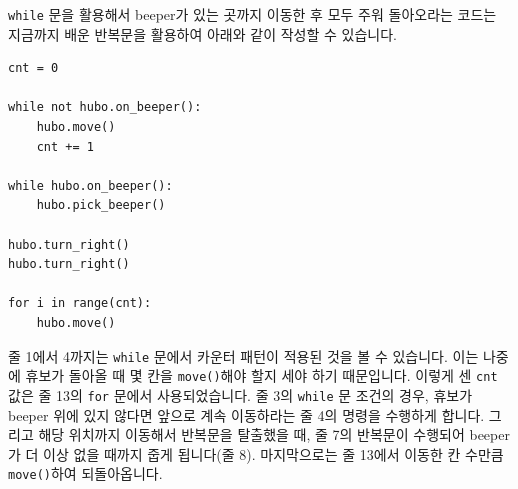 \documentclass[../main.tex]{subfiles}
\begin{document}
\texttt{while} 문을 활용해서 beeper가 있는 곳까지 이동한 후 모두 주워 돌아오라는 코드는 지금까지 배운 반복문을 활용하여 아래와 같이 작성할 수 있습니다.
\begin{verbatim}
cnt = 0

while not hubo.on_beeper():
    hubo.move()
    cnt += 1

while hubo.on_beeper():
    hubo.pick_beeper()

hubo.turn_right()
hubo.turn_right()

for i in range(cnt):
    hubo.move()
\end{verbatim}
줄 1에서 4까지는 \texttt{while} 문에서 카운터 패턴이 적용된 것을 볼 수 있습니다.
이는 나중에 휴보가 돌아올 때 몇 칸을 \texttt{move()}해야 할지 세야 하기 때문입니다.
이렇게 센 \texttt{cnt} 값은 줄 13의 \texttt{for} 문에서 사용되었습니다.
줄 3의 \texttt{while} 문 조건의 경우, 휴보가 beeper 위에 있지 않다면 앞으로 계속 이동하라는 줄 4의 명령을 수행하게 합니다.
그리고 해당 위치까지 이동해서 반복문을 탈출했을 때, 줄 7의 반복문이 수행되어 beeper가 더 이상 없을 때까지 줍게 됩니다(줄 8).
마지막으로는 줄 13에서 이동한 칸 수만큼 \texttt{move()}하여 되돌아옵니다.
\end{document}
